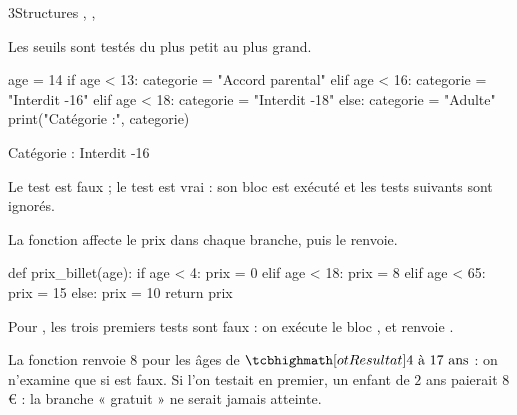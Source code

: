 \begin{corrige}{3}{Structures , , }
\begin{questions}
  \item Les seuils sont testés du plus petit au plus grand.
\begin{codecote}
\begin{pythoncol}
age = 14
if age < 13:
    categorie = "Accord parental"
elif age < 16:
    categorie = "Interdit -16"
elif age < 18:
    categorie = "Interdit -18"
else:
    categorie = "Adulte"
print("Catégorie :", categorie)
\end{pythoncol}
\cote
\begin{consolecol}
Catégorie : Interdit -16
\end{consolecol}

\medskip
Le test  est faux ; le test  est vrai : son bloc est exécuté et les tests suivants sont ignorés.
\end{codecote}
  \item La fonction affecte le prix dans chaque branche, puis le renvoie.
\begin{codecote}
\begin{pythoncol}
def prix_billet(age):
    if age < 4:
        prix = 0
    elif age < 18:
        prix = 8
    elif age < 65:
        prix = 15
    else:
        prix = 10
    return prix
\end{pythoncol}
\cote
Pour , les trois premiers tests sont faux : on exécute le bloc , et  renvoie .
\end{codecote}
  \item La fonction renvoie $8$ pour les âges de $\res{4 \text{ à } 17 \text{ ans}}$ : on n'examine  que si 
    est faux. Si l'on testait  en premier, un enfant de $2$ ans paierait $8$\,€ : la branche « gratuit » ne serait jamais
    atteinte.
\end{questions}
\end{corrige}

